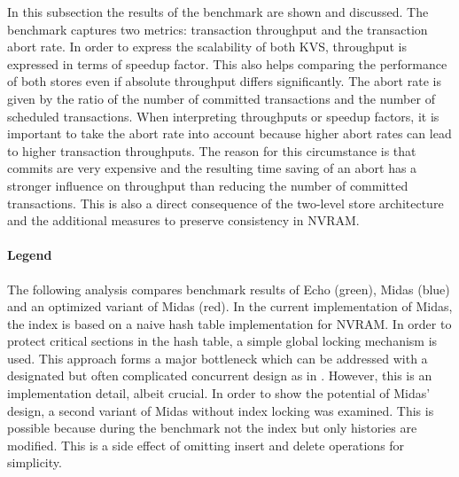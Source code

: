 In this subsection the results of the benchmark are shown and discussed. The benchmark captures two metrics: transaction throughput and the transaction abort rate. In order to express the scalability of both KVS, throughput is expressed in terms of speedup factor. This also helps comparing the performance of both stores even if absolute throughput differs significantly. The abort rate is given by the ratio of the number of committed transactions and the number of scheduled transactions. When interpreting throughputs or speedup factors, it is important to take the abort rate into account because higher abort rates can lead to higher transaction throughputs. The reason for this circumstance is that commits are very expensive and the resulting time saving of an abort has a stronger influence on throughput than reducing the number of committed transactions. This is also a direct consequence of the two-level store architecture and the additional measures to preserve consistency in NVRAM.

\paragraph{Legend}

The following analysis compares benchmark results of Echo (green), Midas (blue) and an optimized variant of Midas (red). In the current implementation of Midas, the index is based on a naive hash table implementation for NVRAM. In order to protect critical sections in the hash table, a simple global locking mechanism is used. This approach forms a major bottleneck which can be addressed with a designated but often complicated concurrent design as in \cite{}. However, this is an implementation detail, albeit crucial. In order to show the potential of Midas' design, a second variant of Midas without index locking was examined. This is possible because during the benchmark not the index but only histories are modified. This is a side effect of omitting insert and delete operations for simplicity.




